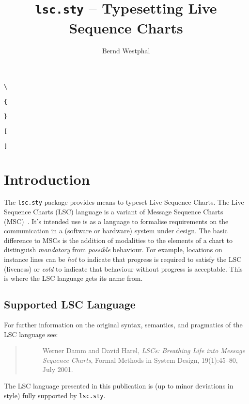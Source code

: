 \documentclass{article}
\title{\texttt{lsc.sty} -- Typesetting Live Sequence Charts}
\author{Bernd Westphal}
\newcommand{\sty}[1]{\texttt{#1.sty}}
\newcommand{\lscsty}{\sty{lsc}}
\begin{document}
\maketitle

\tableofcontents

\begin{lrbox}{\bsbox}\verb"\"\end{lrbox}%
\begin{lrbox}{\lcbbox}\verb"{"\end{lrbox}
\begin{lrbox}{\rcbbox}\verb"}"\end{lrbox}
\begin{lrbox}{\lbbox}\verb"["\end{lrbox}
\begin{lrbox}{\rbbox}\verb"]"\end{lrbox}%

\section{Introduction}
\label{sec:intro}

The \lscsty{} package provides means to typeset 
Live Sequence Charts.
%
The Live Sequence Charts (LSC) language is a variant of 
Message Sequence Charts (MSC)~\cite{ITU-T1993}.
%
It's intended use is as a language to formalise requirements on the
communication in a (software or hardware) system under design.
%
The basic difference to MSCs is the addition of modalities to the elements of
a chart to distinguish
\emph{mandatory} from
\emph{possible} behaviour.
%
For example, locations on instance lines can be
\emph{hot} to indicate that 
progress is required to satisfy the LSC 
(liveness) or 
\emph{cold} to indicate that behaviour without progress is acceptable.
%
This is where the LSC language gets its name from.

\subsection{Supported LSC Language}

For further information on the original syntax, semantics, and pragmatics of
the LSC language see:
%
\begin{quote}
\small
\begin{description}
\item[\cite{DammHarel2001}]
  Werner Damm and David Harel,
  \emph{{LSC}s: Breathing Life into Message Sequence Charts},
  Formal Methods in System Design, 19(1):45--80, July 2001.
\end{description}
\end{quote}
%
The LSC language presented in this publication is (up to minor deviations in
style) fully supported by \lscsty{}.
\end{document}
